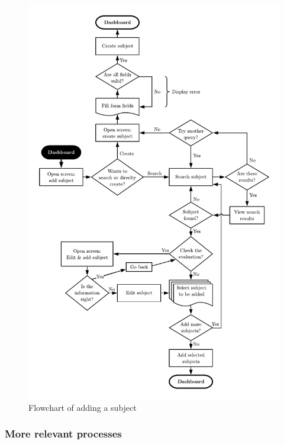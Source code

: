 \clearpage\newpage
\vfill
\begin{figure}[ht!]
    \center
    \includegraphics[height=\textheight-1cm]{media/diagrams/flowchart-add-subject.pdf}
    \caption{Flowchart of adding a subject}
    \label{flowchart-add-subject}
\end{figure}
\vfill

\clearpage\newpage
\subsubsection*{More relevant processes}

